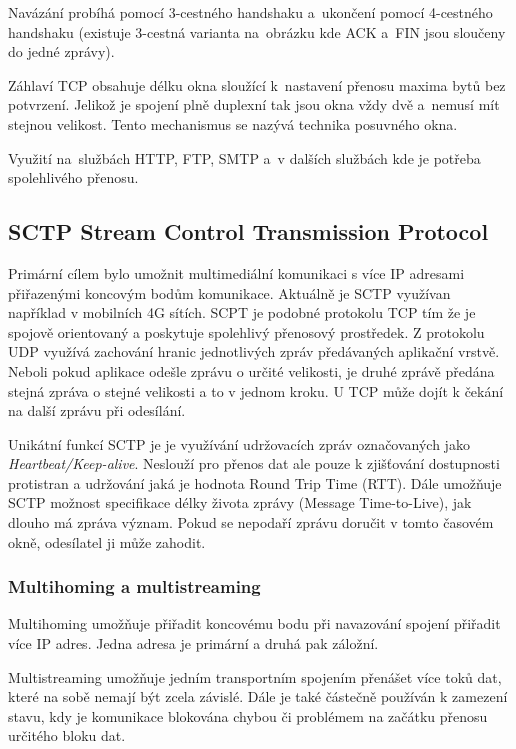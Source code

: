 Navázání probíhá pomocí 3-cestného handshaku a~ukončení pomocí 4-cestného handshaku (existuje 3-cestná varianta na~obrázku kde ACK a~FIN jsou sloučeny do jedné zprávy).

Záhlaví TCP obsahuje délku okna sloužící k~nastavení přenosu maxima bytů bez potvrzení. Jelikož je spojení plně duplexní tak jsou okna vždy dvě a~nemusí mít stejnou velikost. Tento mechanismus se nazývá technika posuvného okna.

Využití na~službách HTTP, FTP, SMTP a~v dalších službách kde je potřeba spolehlivého přenosu.

\subsection{SCTP Stream Control Transmission Protocol}

Primární cílem bylo umožnit multimediální komunikaci s více IP adresami přiřazenými koncovým bodům komunikace.
Aktuálně je SCTP využívan například v mobilních 4G sítích.
SCPT je podobné protokolu TCP tím že je spojově orientovaný a poskytuje spolehlivý přenosový prostředek.
Z protokolu UDP využívá zachování hranic jednotlivých zpráv předávaných aplikační vrstvě.
Neboli pokud aplikace odešle zprávu o určité velikosti, je druhé zprávě předána stejná zpráva o stejné velikosti a to v jednom kroku.
U TCP může dojít k čekání na další zprávu při odesílání.

Unikátní funkcí SCTP je je využívání udržovacích zpráv označovaných jako \textit{Heartbeat/Keep-alive}.
Neslouží pro přenos dat ale pouze k zjišťování dostupnosti protistran a udržování jaká je hodnota Round Trip Time (RTT).
Dále umožňuje SCTP možnost specifikace délky života zprávy (Message Time-to-Live), jak dlouho má zpráva význam.
Pokud se nepodaří zprávu doručit v tomto časovém okně, odesílatel ji může zahodit.

\subsubsection{Multihoming a multistreaming}
Multihoming umožňuje přiřadit koncovému bodu při navazování spojení přiřadit více IP adres.
Jedna adresa je primární a druhá pak záložní.

Multistreaming umožňuje jedním transportním spojením přenášet více toků dat, které na sobě nemají být zcela závislé.
Dále je také částečně používán k zamezení stavu, kdy je komunikace blokována chybou či problémem na začátku přenosu určitého bloku dat.

